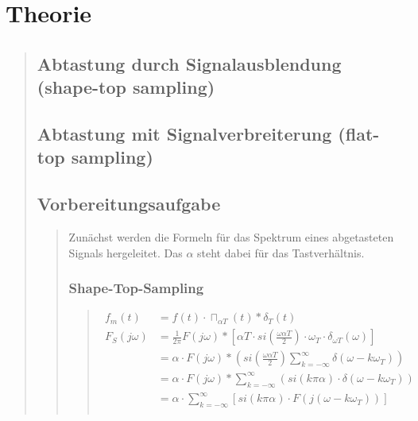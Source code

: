 \section{Theorie}
\begin{quote}
	\subsection{Abtastung durch Signalausblendung (shape-top sampling)}
    \begin{quote}  
        
    \end{quote}
    
    \subsection{Abtastung mit Signalverbreiterung (flat-top sampling)}
    \begin{quote}
    \end{quote}

    
    \subsection{Vorbereitungsaufgabe}
    \begin{quote}        
        Zunächst werden die Formeln für das Spektrum eines abgetasteten Signals
        hergeleitet. Das $\alpha$ steht dabei für das Tastverhältnis.
        
        \subsubsection{Shape-Top-Sampling}
        \begin{quote}
            \begin{equation*}
                \begin{split}
                    f_m (t)   &= f(t) \cdot \sqcap_{\alpha T} (t) \ast \delta_T (t) \\
                    F_S (j\omega) &= \frac{1}{2\pi} F (j\omega) \ast \left [
                    \alpha T \cdot si \left( \frac{\omega \alpha T}{2} \right) \cdot \omega_T \cdot \delta_{\omega T} (\omega) \right] \\
                    &= \alpha \cdot F (j \omega) \ast \left ( si \left( \frac{\omega \alpha T}{2} \right)
                    \sum_{k=-\infty}^{\infty} \delta (\omega - k\omega_T) \right)\\
                    &= \alpha \cdot F (j \omega) \ast \sum_{k=-\infty}^{\infty} (si(k \pi \alpha) \cdot \delta (\omega -
                    k\omega_T))\\
                    &= \alpha \cdot \sum_{k=-\infty}^{\infty} \left [ si(k \pi \alpha) \cdot F (j(\omega - k\omega_T))
                    \right]\\
                \end{split}
            \end{equation*}
        \end{quote}
        

\end{quote}
\end{quote}
